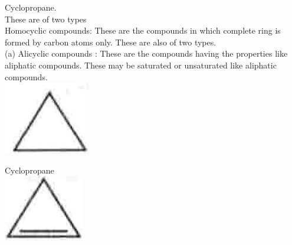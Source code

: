 \documentclass[10pt]{article}
\begin{document}
Cyclopropane.\\
These are of two types\\
Homocyclic compounds: These are the compounds in which complete ring is formed by carbon atoms only. These are also of two types.\\
(a) Alicyclic compounds : These are the compounds having the properties like aliphatic compounds. These may be saturated or unsaturated like aliphatic compounds.\\
\includegraphics[max width=\textwidth, center]{2025_01_28_8470952b98110cec3aabg-008(2)}

Cyclopropane\\
\includegraphics[max width=\textwidth, center]{2025_01_28_8470952b98110cec3aabg-008(3)}
\end{document}
